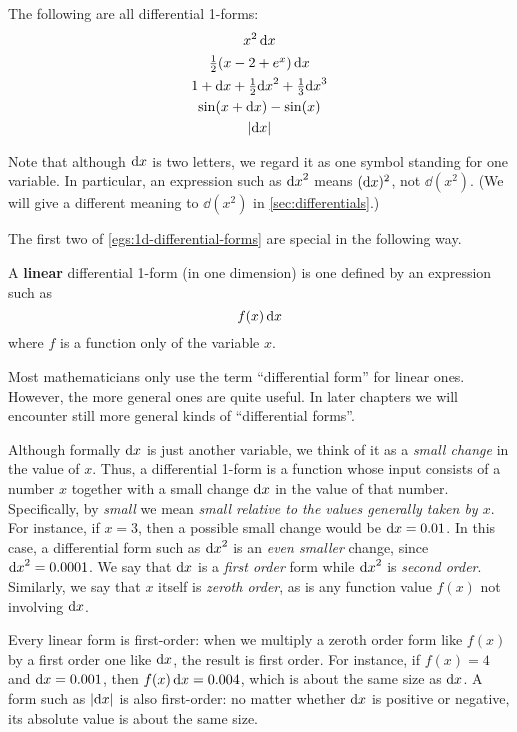 \begin{egs}\label{egs:1d-differential-forms}
  The following are all differential 1-forms:
  \begin{gather*}
    x^2 \,{\mathrm{d} x}\\
    \textstyle\frac{1}{2}({x-2}+e^x)\,{\mathrm{d} x}\\
    1 + {\mathrm{d} x} + \textstyle\frac{1}{2} {\mathrm{d} x}^2 + \textstyle\frac{1}{3} {\mathrm{d} x}^3\\
    \sin(x + {\mathrm{d} x}) - \sin(x)\\
    |{\mathrm{d} x}|
  \end{gather*}
\end{egs}

Note that although ${\mathrm{d} x}$ is two letters, we regard it as one symbol standing for one variable.
In particular, an expression such as ${\mathrm{d} x}^2$ means $({\mathrm{d} x})^2$, not $\dd(x^2)$.
(We will give a different meaning to $\dd(x^2)$ in \cref{sec:differentials}.)

The first two of \cref{egs:1d-differential-forms} are special in the following way.

\begin{defn}
  A \textbf{linear} differential 1-form (in one dimension) is one defined by an expression such as
  \[ f(x) \, {\mathrm{d} x} \]
  where $f$ is a function only of the variable $x$.
\end{defn}

Most mathematicians only use the term ``differential form'' for linear ones.
However, the more general ones are quite useful.
In later chapters we will encounter still more general kinds of ``differential forms''.

Although formally ${\mathrm{d} x}$ is just another variable, we think of it as a \emph{small change} in the value of $x$.
Thus, a differential 1-form is a function whose input consists of a number $x$ together with a small change ${\mathrm{d} x}$ in the value of that number.
Specifically, by \emph{small} we mean \emph{small relative to the values generally taken by $x$}.
For instance, if $x=3$, then a possible small change would be ${\mathrm{d} x} = 0.01$.
In this case, a differential form such as ${\mathrm{d} x}^2$ is an \emph{even smaller} change, since ${\mathrm{d} x}^2 = 0.0001$.
We say that ${\mathrm{d} x}$ is a \emph{first order} form while ${\mathrm{d} x}^2$ is \emph{second order}.
Similarly, we say that $x$ itself is \emph{zeroth order}, as is any function value $f(x)$ not involving ${\mathrm{d} x}$.

Every linear form is first-order: when we multiply a zeroth order form like $f(x)$ by a first order one like ${\mathrm{d} x}$, the result is first order.
For instance, if $f(x) = 4$ and ${\mathrm{d} x} = 0.001$, then $f(x)\,{\mathrm{d} x} = 0.004$, which is about the same size as ${\mathrm{d} x}$.
A form such as $|{\mathrm{d} x}|$ is also first-order: no matter whether ${\mathrm{d} x}$ is positive or negative, its absolute value is about the same size.

